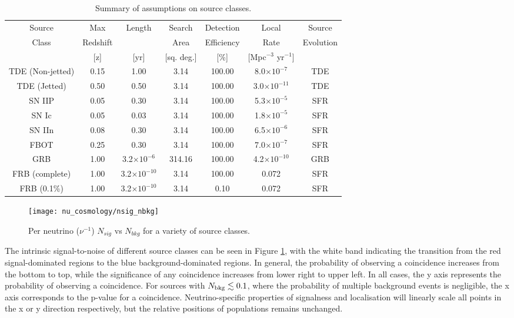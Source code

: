 \begin{table*}[]
	\centering
	\begin{tabular}{||c c c c c c c|} 
	\hline
	Source & Max & Length & Search & Detection & Local & Source \\
	Class & Redshift & &  Area & Efficiency & Rate & Evolution\\
	& [z] & [yr] & [sq. deg.] & [\%] & [Mpc$^{-3}$ yr$^{-1}$] & \\
	\hline
	TDE (Non-jetted) & 0.15 & 1.00 & 3.14 & 100.00 & 8.0$ \times10^{-7}$  & TDE \cite{Sun:2015bda}\\
	TDE (Jetted) & 0.50 & 0.50 & 3.14 & 100.00 & 3.0$ \times10^{-11}$  & TDE \cite{Sun:2015bda}\\
	SN IIP & 0.05 & 0.30 & 3.14 & 100.00 & 5.3$ \times10^{-5}$ & SFR \cite{sfr_madau_14}\\
	SN Ic & 0.05 & 0.03 & 3.14 & 100.00 & 1.8$ \times10^{-5}$  & SFR \cite{sfr_madau_14}\\
	SN IIn & 0.08 & 0.30 & 3.14 & 100.00 & 6.5$ \times10^{-6}$  & SFR \cite{sfr_madau_14}\\
	FBOT & 0.25 & 0.30 & 3.14 & 100.00 & 7.0$ \times10^{-7}$ & SFR \cite{sfr_madau_14}\\
	GRB & 1.00 & 3.2$ \times10^{-6}$ & 314.16 & 100.00 & 4.2$ \times10^{-10}$  & GRB \cite{grb_lien_14} \\
	FRB (complete) & 1.00 & 3.2$ \times10^{-10}$  & 3.14 & 100.00 & 0.072 & SFR \cite{sfr_madau_14}\\
	FRB (0.1\%) & 1.00 & 3.2$ \times10^{-10}$  & 3.14 & 0.10 & 0.072 & SFR \cite{sfr_madau_14} \\
	\hline
	\end{tabular}
	\caption{Summary of assumptions on source classes.}
	\label{tab:source_properties}
\end{table*}{}

\begin{figure}[!ht]
	\centering \texttt{[image: nu\_cosmology/nsig\_nbkg]}
	\caption{Per neutrino ($\nu^{-1}$) $N_{sig}$ vs $N_{bkg}$ for a variety of source classes.}
	\label{fig:nsig_nbkg}
\end{figure}

The intrinsic signal-to-noise of different source classes can be seen in Figure \ref{fig:nsig_nbkg}, with the white band indicating the transition from the red signal-dominated regions to the blue background-dominated regions. In general, the probability of observing a coincidence increases from the bottom to top, while the significance of any coincidence increases from lower right to upper left. In all cases, the y axis represents the probability of observing a coincidence. For sources with $N_{\textup{bkg}} \lesssim 0.1$, where the probability of multiple background events is negligible, the x axis corresponds to the p-value for a coincidence. Neutrino-specific properties of signalness and localisation will linearly scale all points in the x or y direction respectively, but the relative positions of populations remains unchanged. 

